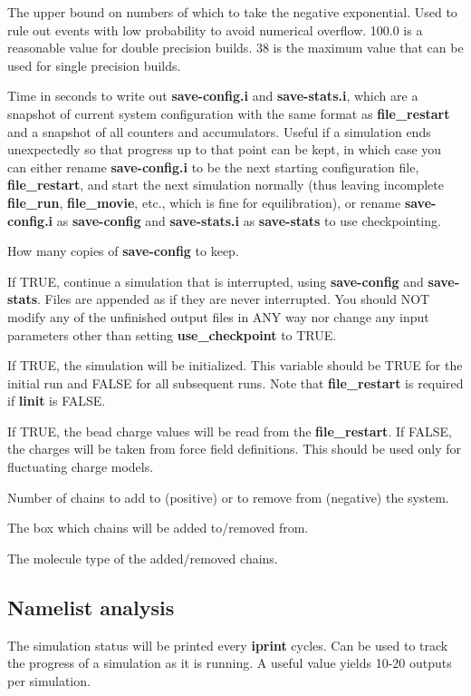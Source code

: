 \documentclass[12pt,letterpaper]{article}
\begin{document}
 The upper bound on numbers of which
to take the negative exponential. Used to rule out events
with low probability to avoid numerical overflow. 100.0 is a
reasonable value for double precision builds. 38 is the
maximum value that can be used for single precision builds.

 Time in seconds to
write out {\bf save-config.i} and {\bf save-stats.i}, which
are a snapshot of current system configuration with the same
format as {\bf file\_restart} and a snapshot of all counters
and accumulators. Useful if a simulation ends unexpectedly
so that progress up to that point can be kept, in which case
you can either rename {\bf save-config.i} to be the next
starting configuration file, {\bf file\_restart}, and start
the next simulation normally (thus leaving incomplete {\bf
  file\_run}, {\bf file\_movie}, etc., which is fine for
equilibration), or rename {\bf save-config.i} as {\bf
  save-config} and {\bf save-stats.i} as {\bf save-stats} to
use checkpointing.

 How many copies of {\bf save-config} to keep.

 If TRUE, continue a
simulation that is interrupted, using {\bf save-config} and
{\bf save-stats}. Files are appended as if they are never
interrupted. You should NOT modify any of the unfinished
output files in ANY way nor change any input parameters
other than setting \textbf{use\_checkpoint} to TRUE.

 If TRUE, the simulation will be
initialized. This variable should be TRUE for the initial
run and FALSE for all subsequent runs. Note that {\bf
  file\_restart} is required if {\bf linit} is FALSE.

 If TRUE, the bead charge values will
be read from the {\bf file\_restart}. If FALSE, the charges
will be taken from force field definitions. This should be
used only for fluctuating charge models.

 Number of chains to add to (positive)
or to remove from (negative) the system.

 The box which chains will be
added to/removed from.

 The molecule type of the
added/removed chains.

\subsection{Namelist \textbf{analysis}}
 The simulation status will be printed
every {\bf iprint} cycles. Can be used to track the progress
of a simulation as it is running. A useful value yields
10-20 outputs per simulation.
\end{document}
